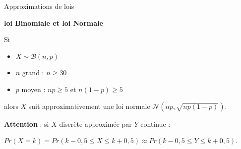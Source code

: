 \documentclass{beamer}
\begin{document}
\begin{frame}{Approximations de lois}

\begin{center}{\bf \large loi Binomiale et loi Normale } \end{center}

 \vspace{0.5cm}

\begin{minipage}{0.6\textwidth}
Si 
\begin{itemize}
\item $X\sim \mathcal{B}(n,p)$ 
\item $n$ grand : $n\geq 30$ 
\item $p$ moyen : $np\geq 5$ et  $n(1-p)\geq 5$ \\
\end{itemize} 
 \vspace{0.2cm}
alors $X$ suit approximativement une loi normale \small $\mathcal{N}(np, \sqrt{np(1-p)})$.
\end{minipage}
\begin{minipage}{0.15 \textwidth}
\begin{center}
\end{center}
\end{minipage}
 
 \vspace{0.5cm}
 
  {\bf Attention} : si $X$ discrète approximée  par $Y$ continue :

 \small $
Pr(X=k)=Pr(k-0,5 \leq X \leq k+0,5) \approx Pr( k-0,5 \leq Y \leq
k+0,5).
$


\end{frame} 
\end{document}
